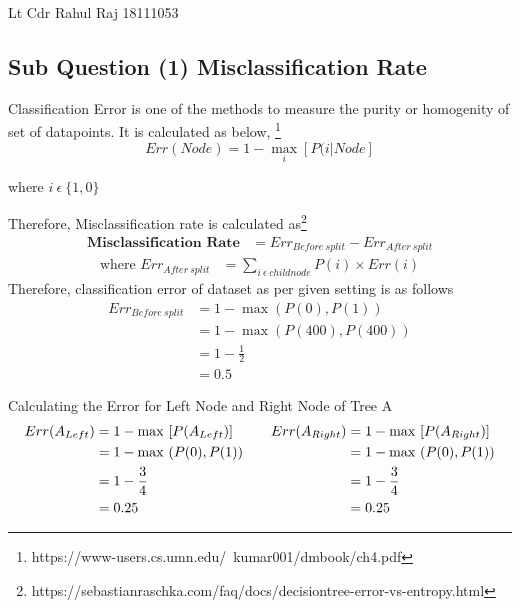 \documentclass[a4paper,11pt]{article}
\newcommand\tab[1][1cm]{\hspace*{#1}}
\begin{document}
{Lt Cdr Rahul Raj}   %
{18111053}	%

\begin{mlsolution}
\section*{Sub Question (1)  Misclassification Rate	}

\tab Classification Error is one of the methods to measure the purity or homogenity of set of datapoints. It is calculated as below, \footnote{https://www-users.cs.umn.edu/~kumar001/dmbook/ch4.pdf}
$$Err(Node) = 1 - \max\limits_{i} [P(i|Node] $$ 
\begin{center}

\tab where $i\ \epsilon\ \{1,0\}$\\
\end{center}
\tab Therefore, Misclassification rate is calculated as\footnote{https://sebastianraschka.com/faq/docs/decisiontree-error-vs-entropy.html}
\begin{align*} 
  \textbf{Misclassification Rate} &= Err_{Before\ split} - Err_{After\ split}
\end{align*}
\begin{align*}
\text{where\ }
Err_{After\ split} &= \sum\limits_{i\ \epsilon\ child node} {P(i) \times Err(i)}
\end{align*}
\noindent
\tab Therefore, classification error of dataset as per given setting is as follows
\begin{align*} 
  Err_{Before\ split} &= 1 - \max(P({0}),P({1}))\\
  &= 1 - \max(P(400),P(400))\\
  &= 1 - \frac{1}{2}\\
  &= 0.5
\end{align*}

\noindent
\tab Calculating the Error for  Left Node and Right Node of Tree A\\
\begin{equation*}
  \begin{split}
    Err(A_{Left}) &= 1 - \max\ [P(A_{Left})]\\
    &= 1 - \max\ (P(0), P(1))\\
    &= 1 - \frac{3}{4}\\
    &= 0.25
  \end{split}
\quad\linebreak\quad
  \begin{split}
    Err(A_{Right}) &= 1 - \max\ [P(A_{Right})]\\
    &= 1 - \max\ (P(0), P(1))\\
    &= 1 - \frac{3}{4}\\
    &= 0.25
  \end{split}
\end{equation*}


\end{mlsolution}
\end{document}
